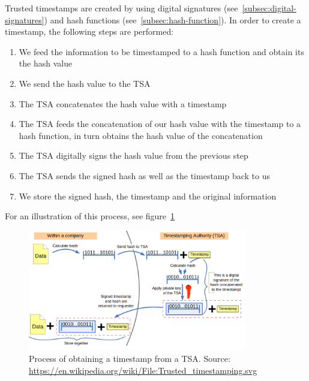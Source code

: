 Trusted timestamps are created by using digital signatures (see~\ref{subsec:digital-signatures}) and hash functions (see~\ref{subsec:hash-function}).
In order to create a timestamp, the following steps are performed:
\begin{enumerate}
    \item We feed the information to be timestamped to a hash function and obtain its the hash value
    \item We send the hash value to the \gls{TSA}
    \item The \gls{TSA} concatenates the hash value with a timestamp
    \item The \gls{TSA} feeds the concatenation of our hash value with the timestamp to a hash function, in turn obtains the hash value of the concatenation
    \item The \gls{TSA} digitally signs the hash value from the previous step
    \item The \gls{TSA} sends the signed hash as well as the timestamp back to us
    \item We store the signed hash, the timestamp and the original information
\end{enumerate}
For an illustration of this process, see figure~\ref{fig:timestamping}

\begin{figure}
    \centering
    \includegraphics[width=0.85\textwidth]{images/timestamping.png}
    \caption{Process of obtaining a timestamp from a \acrfull{TSA}.
    Source: \url{https://en.wikipedia.org/wiki/File:Trusted_timestamping.svg}}
    \label{fig:timestamping}
\end{figure}


